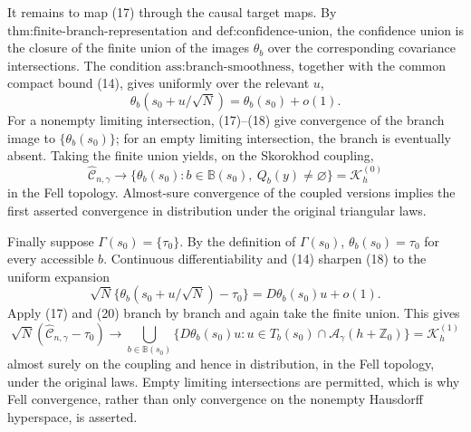 It remains to map (17) through the causal target maps.  By \(\text{thm:finite-branch-representation}\) and \(\text{def:confidence-union}\), the confidence union is the closure of the finite union of the images \(\theta_b\) over the corresponding covariance intersections.  The condition \(\text{ass:branch-smoothness}\), together with the common compact bound (14), gives uniformly over the relevant \(u\),
\[
 \theta_b(s_0+u/\sqrt N)=\theta_b(s_0)+o(1).
 \tag{18}
\]
For a nonempty limiting intersection, (17)--(18) give convergence of the branch image to \(\{\theta_b(s_0)\}\); for an empty limiting intersection, the branch is eventually absent.  Taking the finite union yields, on the Skorokhod coupling,
\[
 \widehat{\mathcal C}_{n,\gamma}\longrightarrow
 \{\theta_b(s_0):b\in\mathbb B(s_0),\ Q_b(y)\ne\varnothing\}
 =\mathcal K_h^{(0)}
 \tag{19}
\]
in the Fell topology.  Almost-sure convergence of the coupled versions implies the first asserted convergence in distribution under the original triangular laws.

Finally suppose \(\Gamma(s_0)=\{\tau_0\}\).  By the definition of \(\Gamma(s_0)\), \(\theta_b(s_0)=\tau_0\) for every accessible \(b\).  Continuous differentiability and (14) sharpen (18) to the uniform expansion
\[
 \sqrt N\{\theta_b(s_0+u/\sqrt N)-\tau_0\}
 =D\theta_b(s_0)u+o(1).
 \tag{20}
\]
Apply (17) and (20) branch by branch and again take the finite union.  This gives
\[
 \sqrt N(\widehat{\mathcal C}_{n,\gamma}-\tau_0)
 \longrightarrow
 \bigcup_{b\in\mathbb B(s_0)}
 \{D\theta_b(s_0)u:u\in T_b(s_0)\cap
 \mathcal A_\gamma(h+\mathbb Z_0)\}
 =\mathcal K_h^{(1)}
 \tag{21}
\]
almost surely on the coupling and hence in distribution, in the Fell topology, under the original laws.  Empty limiting intersections are permitted, which is why Fell convergence, rather than only convergence on the nonempty Hausdorff hyperspace, is asserted.